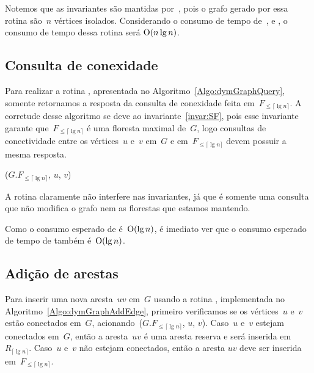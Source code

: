 Notemos que as invariantes são mantidas por~\dymGraphCreate{}, pois o grafo gerado por essa rotina são~$n$ vértices isolados.
Considerando o consumo de tempo de~\dymForestCreate{}, \graphCreate{} e \hashCreate{}, o consumo de tempo dessa rotina será $\mathrm{O}(n\lg n)$.

\subsection{Consulta de conexidade}

Para realizar a rotina \dymGraphQuery{}, apresentada no Algoritmo~\ref{Algo:dymGraphQuery}, somente retornamos a resposta da consulta de conexidade feita em~$F_{\leqslant \lceil \lg n \rceil}$.
A corretude desse algoritmo se deve ao invariante~\ref{invar:SF}, pois esse invariante garante que~$F_{\leqslant\lceil \lg n \rceil}$ é uma floresta maximal de~$G$, logo consultas de conectividade entre os vértices~$u$ e~$v$ em~$G$ e em~$F_{\leqslant\lceil \lg n \rceil}$ devem possuir a mesma resposta.

\begin{algorithm}
\caption{\dymGraphQuery($G$, $u$, $v$)}
\label{Algo:dymGraphQuery}
\begin{algorithmic}[1]
\State \Return \dymForestQuery($G$.$F_{\leqslant\lceil \lg n \rceil}$, $u$, $v$)
\end{algorithmic}
\end{algorithm}

A rotina \dymGraphQuery{} claramente não interfere nas invariantes, já que  é somente uma consulta que não modifica o grafo nem as florestas que estamos mantendo.

Como o consumo esperado de \dymForestQuery{} é~$\mathrm{O}(\lg n)$, é imediato ver que o consumo esperado de tempo de \dymGraphQuery{} também é~$\mathrm{O}(\lg n)$.

\subsection{Adição de arestas}

Para inserir uma nova aresta~$uv$ em~$G$ usando a rotina \dymGraphAddEdge{}, implementada no Algoritmo~\ref{Algo:dymGraphAddEdge}, primeiro verificamos se os vértices~$u$ e~$v$ estão conectados em~$G$, acionando~\dymForestQuery($G.F_{\leqslant \lceil \lg n \rceil}$, $u$, $v$). Caso~$u$ e~$v$ estejam conectados em~$G$, então a aresta~$uv$ é uma aresta reserva e será inserida em~$R_{\lceil \lg n \rceil}$. Caso~$u$ e~$v$ não estejam conectados, então a aresta $uv$ deve ser inserida em~$F_{\leqslant \lceil \lg n \rceil}$.


